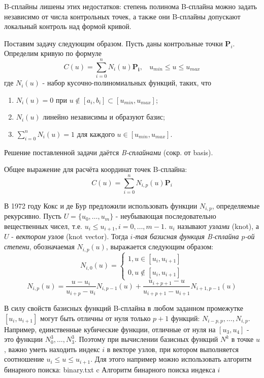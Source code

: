 \documentclass{bmstu}
\begin{document}
B-сплайны лишены этих недостатков: степень полинома B-сплайна можно задать независимо от числа контрольных точек, а также они B-сплайны допускают локальный контроль над формой кривой.

Поставим задачу следующим образом. Пусть даны контрольные точки $\mathbf{P}_i$. Определим кривую по формуле
\begin{equation}
    C(u) = \sum\limits_{i=0}^{n}N_i(u)\mathbf{P_i},~~~~u_{min}\le u \le u_{max}
\end{equation}
где $N_i(u)$ - набор кусочно-полиномиальных функций, таких, что
\begin{enumerate}
    \item $N_i(u) = 0$ при $u\notin[a_i, b_i]\subset[u_{min}, u_{max}]$;
    \item $N_i(u)$ линейно независимы и образуют базис;
    \item $\sum\limits_{i=0}^nN_i(u) = 1$ для каждого $u\in[u_{min}, u_{max}]$.
\end{enumerate}

Решение поставленной задачи даётся \textit{B-сплайнами} (сокр. от basis).

Общее выражение для расчёта координат точек B-сплайна:
\begin{equation}
    C(u) = \sum\limits_{i=0}^nN_{i,p}(u)\mathbf{P}_i
\end{equation}

В 1972 году Кокс и де Бур предложили использовать функции $N_{i, p}$, определяемые рекурсивно. Пусть $U=\{u_0,\dots,u_m\}$ - неубывающая последовательно  вещественных чисел, т.е. $u_i\le u_{i+1}, i=0,\dots,m-1$. $u_i$ называют \textit{узлами} (knot), а $U$ - \textit{вектором узлов} (knot vector). Тогда \textit{$i$-тая базисная функция B-сплайна $p$-ой степени}, обозначаемая $N_{i,p}(u)$, выражается следующим образом:
\begin{equation}
    N_{i, 0}(u) = \begin{cases}
        1, u\in[u_{i}, u_{i+1}] \\
        0, u\notin[u_{i}, u_{i+1}]
    \end{cases}
\end{equation}
\begin{equation}
    N_{i, p}(u) = \frac{u-u_i}{u_{i+p}-u_i}N_{i, p-1}(u)+\frac{u_{i+p+1}-u}{u_{i+p+1}-u_{i+1}}N_{i+1, p-1}(u)
\end{equation}

В силу свойств базисных функций B-сплайна в любом заданном промежутке $[u_i, u_{i+1}]$ могут быть отличны от нуля только $p+1$ функций: $N_{i-p, p},\dots,N_{i,p}$. Например, единственные кубические функции, отличные от нуля на $[u_3, u_4]$ - это функции $N_0^3,\dots,N_3^3$.
Поэтому при вычислении базисных функций $N^k$ в точке $u$, важно уметь находить индекс $i$ в векторе узлов, при котором выполняется соотношение $u_i\le u \le u_{i+1}$.
Для этого например можно использовать алгоритм бинарного поиска:
{binary.txt} %
{c} %
{Алгоритм бинарного поиска индекса $i$} %
\end{document}
